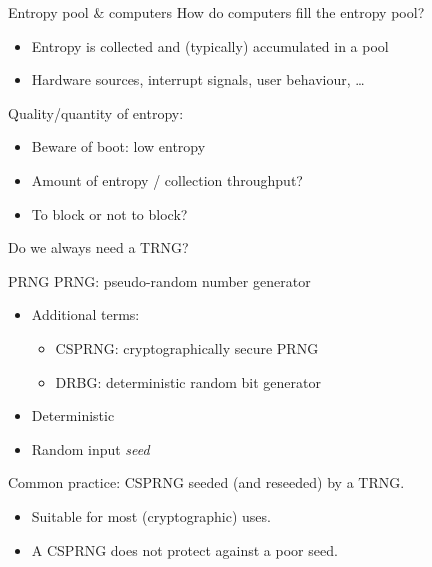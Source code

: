\begin{frame}{Entropy pool \& computers}
  \pause
  How do computers fill the entropy pool?
  \begin{itemize}[<+(1)->]
    \item Entropy is collected and (typically) accumulated in a pool
    \item Hardware sources, interrupt signals, user behaviour, \dots
  \end{itemize}

  \vspace*{1em}

  \pause
  Quality/quantity of entropy:
  \begin{itemize}[<+(1)->]
    \item Beware of boot: low entropy
    \item Amount of entropy / collection throughput?
    \item To block or not to block?
  \end{itemize}

  \vspace*{1em}

  \pause
  Do we always need a TRNG?
\end{frame}

\begin{frame}{PRNG}
  PRNG: pseudo-random number generator
  \begin{itemize}[<+(1)->]
    \item Additional terms:
    \begin{itemize}
      \item CSPRNG: cryptographically secure PRNG
      \item DRBG: deterministic random bit generator
    \end{itemize}
    \item Deterministic
    \item Random input \emph{seed}
  \end{itemize}

  \vspace*{1em}

  \pause
  Common practice: CSPRNG seeded (and reseeded) by a TRNG.
  \begin{itemize}[<+(1)->]
    \item Suitable for most (cryptographic) uses.
    \item A CSPRNG does not protect against a poor seed.
  \end{itemize}
\end{frame}

